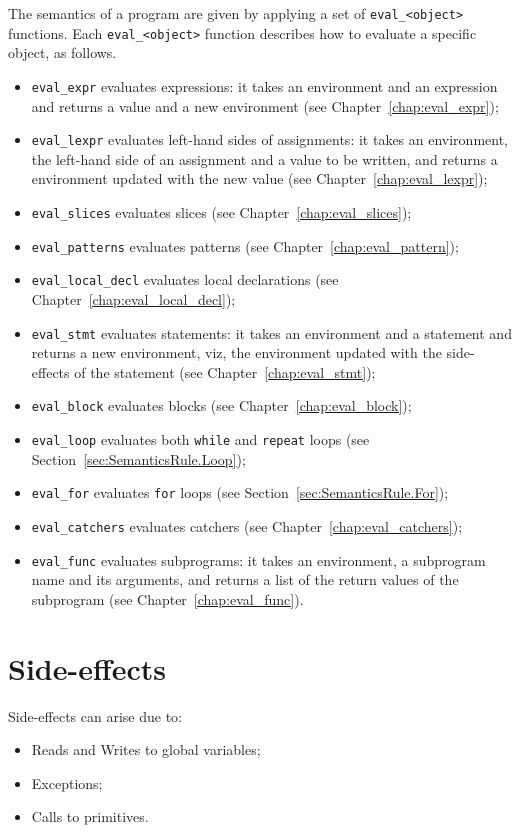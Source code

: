 \documentclass{book}
\begin{document}
The semantics of a program are given by applying a set of
\texttt{eval\_<object>} functions. Each \texttt{eval\_<object>} function
describes how to evaluate a specific object, as follows.
\begin{itemize}
\item \texttt{eval\_expr} evaluates expressions: it takes an
environment and an expression and returns a value and a
new environment (see Chapter~\ref{chap:eval_expr});
\item \texttt{eval\_lexpr} evaluates left-hand sides of assignments: it takes
an environment, the left-hand side of an assignment and a value to be written,
and returns a environment updated with the new value (see
Chapter~\ref{chap:eval_lexpr});
\item \texttt{eval\_slices} evaluates slices (see Chapter~\ref{chap:eval_slices});
\item \texttt{eval\_patterns} evaluates patterns (see Chapter~\ref{chap:eval_pattern});
\item \texttt{eval\_local\_decl} evaluates local declarations (see Chapter~\ref{chap:eval_local_decl});
\item \texttt{eval\_stmt} evaluates statements: it takes an
environment and a statement and returns a new
environment, viz, the environment updated with the side-effects
of the statement (see Chapter~\ref{chap:eval_stmt});
\item \texttt{eval\_block} evaluates blocks (see Chapter~\ref{chap:eval_block});
\item \texttt{eval\_loop} evaluates both \texttt{while} and \texttt{repeat} loops (see Section~\ref{sec:SemanticsRule.Loop});
\item \texttt{eval\_for} evaluates \texttt{for} loops (see Section~\ref{sec:SemanticsRule.For});
\item \texttt{eval\_catchers} evaluates catchers (see Chapter~\ref{chap:eval_catchers});
\item \texttt{eval\_func} evaluates subprograms: it takes an
environment, a subprogram name and its arguments, and returns a
list of the return values of the subprogram (see Chapter~\ref{chap:eval_func}). 
\end{itemize}

\section{Side-effects}

Side-effects can arise due to:
\begin{itemize}
\item Reads and Writes to global variables;
\item Exceptions;
\item Calls to primitives.
\end{itemize}
\end{document}
